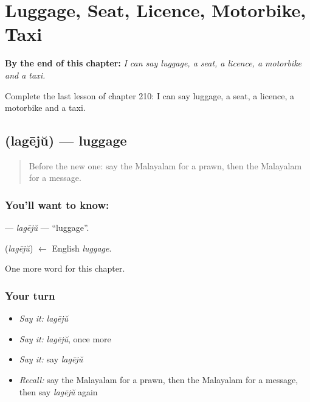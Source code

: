 
\chapter{Luggage, Seat, Licence, Motorbike, Taxi}
\label{ch:ml-luggage-seat-licence-motorbike-taxi}

\begin{chapteropening}
\textbf{By the end of this chapter:} \emph{I can say luggage, a seat, a licence, a motorbike and a taxi.}

Complete the last lesson of chapter 210: I can say luggage, a seat, a licence, a motorbike and a taxi.
\end{chapteropening}

\section[\texorpdfstring{\ml{ലഗേജ്} (lagējŭ)}{ലഗേജ് (lagējŭ)}]{ (lagējŭ) — luggage}

\label{lesson:ML-C210-lageju}



\begin{quote}
Before the new one: say the Malayalam for a prawn, then the Malayalam for a message.
\end{quote}

\subsection*{You'll want to know: }
\textbf{} — \emph{lagējŭ} — \textquotedblleft{}luggage\textquotedblright{}.

\begin{cousinweb}
\textbf{} (\emph{lagējŭ}) $\leftarrow$ English \emph{luggage}.
\end{cousinweb}

\begin{grammarlens}[title={What you've built}]
One more word for this chapter.
\end{grammarlens}

\subsection*{Your turn}
\begin{itemize}
\raggedright
  \item \emph{Say it:} \emph{lagējŭ}
  \item \emph{Say it:} \emph{lagējŭ}, once more
  \item \emph{Say it:} say \emph{lagējŭ}
  \item \emph{Recall:} say the Malayalam for a prawn, then the Malayalam for a message, then say \emph{lagējŭ} again
\end{itemize}

